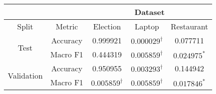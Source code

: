 \begin{tabular}{|c|c|c|c|c|}
\hline
& &  \multicolumn{3}{c|}{Dataset} \\
\hline
Split & Metric &  Election &    Laptop &  Restaurant\\
\hline
\multirow{2}{*}{Test} & Accuracy &  0.999921 &  $0.000029^\dagger$ &    0.077711 \\
& Macro F1 &  0.444319 &  $0.005859^\dagger$ &    $0.024975^\ast$ \\
\hline
\multirow{2}{*}{Validation}  & Accuracy &  0.950955 &  $0.003293^\dagger$ &    0.144942 \\
& Macro F1 &  $0.005859^\dagger$ &  $0.005859^\dagger$ &    $0.017846^\ast$ \\
\hline
\end{tabular}